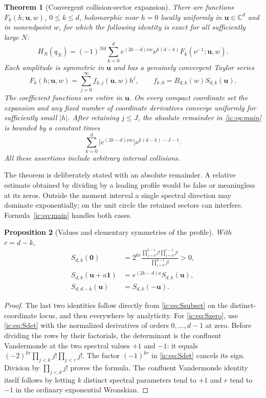 \documentclass[11pt,a4paper]{article}
\numberwithin{equation}{section}
\newtheorem{theorem}{Theorem}[section]
\newtheorem{proposition}[theorem]{Proposition}
\theoremstyle{definition}
\theoremstyle{remark}
\newcommand{\CC}{\mathbb C}
\newcommand{\bu}{\boldsymbol u}
\begin{document}
\begin{theorem}[Convergent collision-sector expansion]\label{ic:thm:main}
There are functions $F_k(h;\bu,w)$, $0\le k\le d$, holomorphic near
$h=0$ locally uniformly in $\bu\in\CC^d$ and in nonendpoint $w$, for
which the following identity is exact for all sufficiently large $N$:
\begin{equation}\label{ic:eq:main}
 H_N(q_N)=(-1)^{Nd}\sum_{k=0}^d
 e^{(2k-d)\nu w}\nu^{k(d-k)}F_k(\nu^{-1};\bu,w).
\end{equation}
Each amplitude is symmetric in $\bu$ and has a genuinely convergent
Taylor series
\begin{equation}\label{ic:eq:tay}
 F_k(h;\bu,w)=\sum_{j=0}^{\infty}f_{k,j}(\bu,w)h^j,
 \qquad f_{k,0}=B_{d,k}(w)S_{d,k}(\bu).
\end{equation}
The coefficient functions are entire in $\bu$. On every compact
coordinate set the expansion and any fixed number of coordinate
derivatives converge uniformly for sufficiently small $|h|$.
After retaining $j\le J$, the absolute remainder in
\eqref{ic:eq:main} is bounded by a constant times
\begin{equation}\label{ic:eq:absolute}
 \sum_{k=0}^d
 \bigl|e^{(2k-d)\nu w}\bigr|\nu^{k(d-k)-J-1}.
\end{equation}
All these assertions include arbitrary internal collisions.
\end{theorem}

The theorem is deliberately stated with an absolute remainder. A
relative estimate obtained by dividing by a leading profile would be
false or meaningless at its zeros. Outside the moment interval a single
spectral direction may dominate exponentially; on the unit circle the
retained sectors can interfere. Formula~\eqref{ic:eq:main} handles both cases.

\begin{proposition}[Values and elementary symmetries of the profile]
\label{ic:prop:Sfacts}
With $r=d-k$,
\begin{align}
 S_{d,k}(\boldsymbol0)
 &=2^{kr}\frac{\prod_{j=0}^{k-1}j!\prod_{j=0}^{r-1}j!}
                    {\prod_{j=0}^{d-1}j!}>0,\label{ic:eq:Szero}\\
 S_{d,k}(\bu+a\boldsymbol1)&=e^{(2k-d)a}S_{d,k}(\bu),\label{ic:eq:Sshift}\\
 S_{d,d-k}(\bu)&=S_{d,k}(-\bu).\label{ic:eq:Sreflection}
\end{align}
\end{proposition}
\begin{proof}
The last two identities follow directly from \eqref{ic:eq:Ssubset} on the
distinct-coordinate locus, and then everywhere by analyticity. For
\eqref{ic:eq:Szero}, use \eqref{ic:eq:Sdet} with the normalized derivatives of
orders $0,\ldots,d-1$ at zero. Before dividing the rows by their
factorials, the determinant is the confluent Vandermonde at the two
spectral values $+1$ and $-1$: it equals
$(-2)^{kr}\prod_{j<k}j!\prod_{j<r}j!$. The factor $(-1)^{kr}$ in
\eqref{ic:eq:Sdet} cancels its sign. Division by $\prod_{j<d}j!$ proves the
formula. The confluent Vandermonde identity itself follows by letting
$k$ distinct spectral parameters tend to $+1$ and $r$ tend to $-1$ in the
ordinary exponential Wronskian.
\end{proof}
\end{document}
